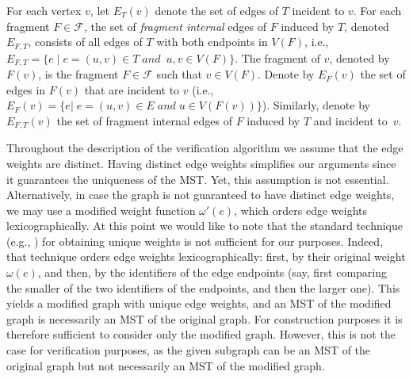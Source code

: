 \documentclass[11pt,letter]{article}
\def\cF{\mathcal{F}}
\begin{document}
For each vertex $v$, let $E_T(v)$ denote the set of edges of $T$ incident to $v$.
For each fragment $F\in \cF$, the set of {\em fragment internal} 
edges of $F$ induced by $T$, denoted $E_{F,T}$, consists of all edges of $T$ with both 
endpoints in $V(F)$, i.e., 
$E_{F,T}=\{e\; |\; e=(u,v)\in T \; and \;  \ u,v\in V(F)\}$.
The fragment of $v$, denoted by $F(v)$, is the fragment 
$F\in \cF$ such that $v\in V(F)$.
Denote by $E_{F}(v)$ the set of edges in $F(v)$ that are incident to $v$ 
(i.e., $E_{F}(v)=\{e | \; e=(u,v)\in E\; and \;  u\in V(F(v))\}$).
Similarly, denote by $E_{F,T}(v)$ the set of fragment internal edges of $F$ induced by $T$ 
and incident to~$v$.

Throughout the description of the verification algorithm we assume that 
the edge weights are distinct. Having distinct edge weights simplifies our arguments   
since it guarantees the uniqueness of the MST. Yet,  this assumption is not essential. Alternatively, in case the graph is not guaranteed 
to have distinct edge weights, we may use a modified weight function 
$\omega'(e)$, which orders edge weights lexicographically. 
At this point we would like to note that the standard technique (e.g., \cite{GHS_83}) for obtaining unique weights is not sufficient for our purposes. 
Indeed, that technique orders edge weights lexicographically:  
first, by their original weight $\omega(e)$, and then, by the identifiers of 
the edge endpoints (say, first comparing the smaller of the two identifiers of the endpoints, and then the larger one). 
This yields a modified graph with unique edge weights, and an MST of the modified graph is necessarily an MST of the original graph. 
For construction purposes it is therefore sufficient to consider only 
the modified graph. However, this is not the case for verification purposes, 
as the given subgraph can be an MST of the original graph but not necessarily 
an MST of the modified graph. 
\end{document}
